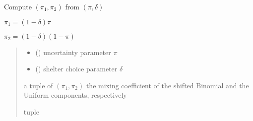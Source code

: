 \documentclass[letterpaper,10pt,english]{sphinxmanual}
\begin{document}
\begin{fulllineitems}
\label{\detokenize{cubmods:cubmods.cubsh.pidelta_to_pi1pi2}}
\pysigstartsignatures
{}
\pysigstopsignatures
\sphinxAtStartPar
Compute \((\pi_1, \pi_2)\) from \((\pi, \delta)\)

\sphinxAtStartPar
\(\pi_1 = (1 - \delta) \pi\)

\sphinxAtStartPar
\(\pi_2 = (1 - \delta)(1 - \pi)\)
\begin{quote}\begin{description}
\begin{itemize}
\item {} 
\sphinxAtStartPar
{} () \textendash{} uncertainty parameter \(\pi\)

\item {} 
\sphinxAtStartPar
{} () \textendash{} shelter choice parameter \(\delta\)

\end{itemize}

\sphinxAtStartPar
a tuple of \((\pi_1, \pi_2)\) the mixing coefficient of the shifted
Binomial and the Uniform components, respectively

\sphinxAtStartPar
tuple

\end{description}\end{quote}

\end{fulllineitems}

\end{document}
